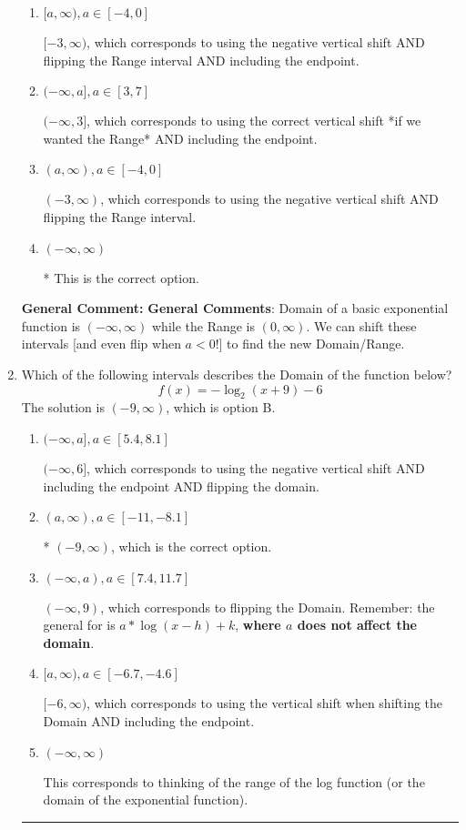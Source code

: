 \documentclass{extbook}[14pt]
\newcommand{\litem}[1]{\item #1

\rule{\textwidth}{0.4pt}}
\begin{document}
\begin{enumerate}
{\begin{enumerate}[label=\Alph*.]
$(-\infty, 3)$, which corresponds to using the correct vertical shift *if we wanted the Range*.
\item \( [a, \infty), a \in [-4, 0] \)

$[-3, \infty)$, which corresponds to using the negative vertical shift AND flipping the Range interval AND including the endpoint.
\item \( (-\infty, a], a \in [3, 7] \)

$(-\infty, 3]$, which corresponds to using the correct vertical shift *if we wanted the Range* AND including the endpoint.
\item \( (a, \infty), a \in [-4, 0] \)

$(-3, \infty)$, which corresponds to using the negative vertical shift AND flipping the Range interval.
\item \( (-\infty, \infty) \)

* This is the correct option.
\end{enumerate}

\textbf{General Comment:} \textbf{General Comments}: Domain of a basic exponential function is $(-\infty, \infty)$ while the Range is $(0, \infty)$. We can shift these intervals [and even flip when $a<0$!] to find the new Domain/Range.
}
\litem{
Which of the following intervals describes the Domain of the function below?
\[ f(x) = -\log_2{(x+9)}-6 \]The solution is \( (-9, \infty) \), which is option B.\begin{enumerate}[label=\Alph*.]
\item \( (-\infty, a], a \in [5.4, 8.1] \)

$(-\infty, 6]$, which corresponds to using the negative vertical shift AND including the endpoint AND flipping the domain.
\item \( (a, \infty), a \in [-11, -8.1] \)

* $(-9, \infty)$, which is the correct option.
\item \( (-\infty, a), a \in [7.4, 11.7] \)

$(-\infty, 9)$, which corresponds to flipping the Domain. Remember: the general for is $a*\log(x-h)+k$, \textbf{where $a$ does not affect the domain}.
\item \( [a, \infty), a \in [-6.7, -4.6] \)

$[-6, \infty)$, which corresponds to using the vertical shift when shifting the Domain AND including the endpoint.
\item \( (-\infty, \infty) \)

This corresponds to thinking of the range of the log function (or the domain of the exponential function).
\end{enumerate}

}
\end{enumerate}
\end{document}
